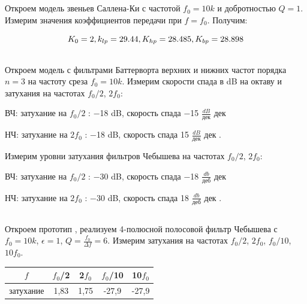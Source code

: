 \documentclass[a4paper, 12pt]{article}%
\begin{document}
\subsection{}
Откроем модель звеньев Саллена-Ки с частотой $f_0 = 10k$ и добротностью $Q = 1$.
Измерим значения коэффициентов передачи при $f = f_0$. Получим:

\begin{equation*}
    K_0 = 2, \space k_{lp} = 29.44, \space K_{hp} = 28.485, \space K_{bp} = 28.898
\end{equation*}

\subsection{}

Откроем модель с фильтрами Баттерворта верхних и нижних частот
порядка $n = 3$ на частоту среза $f_0 = 10k$. Измерим скорости спада в dB на октаву и
затухания на частотах $f_0/2$, $2f_0$:
\par
ВЧ: затухание на $f_0/2$ : −18 dB, скорость спада −15 $\frac{dB}{\text{дек}}$
дек
\par
НЧ: затухание на $2f_0$ : −18 dB, скорость спада 15 $\frac{dB}{\text{дек}}$
дек
.
\medskip
\par
Измерим уровни затухания фильтров Чебышева на частотах $f_0/2$, $2f_0$:
\par
ВЧ: затухание на $f_0/2$ : −30 dB, скорость спада −18 $\frac{db}{\text{деб}}$
дек
\par
НЧ: затухание на $2f_0$ : −30 dB, скорость спада 18 $\frac{db}{\text{деб}}$
дек
.

\subsection{}
Откроем прототип , реализуем 4-полюсной полосовой фильтр Чебышева
с  $f_0 = 10k$, $\epsilon = 1$, $Q = \frac{f_0}{\Delta f} = 6$. Измерим затухания на частотах $f_0/2$, $2f_0$, $f_0/10$, $10f_0$.

\begin{center}
\begin{tabular}{|c|c|c|c|c|}
\hline 
$f$ & $f_0$/2 & 2$f_0$ & $f_0$/10 & 10$f_0$ \\ 
\hline 
затухание & 1,83 & 1,75 & -27,9 & -27,9 \\ 
\hline 
\end{tabular} 
\end{center}
\end{document}
